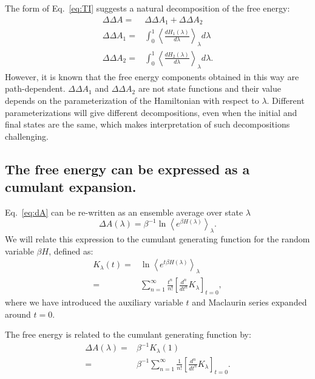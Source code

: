 \documentclass{article}
\begin{document}
The form of Eq.~\ref{eq:TI} suggests a natural decomposition of the free energy:
\begin{align}
\Delta\Delta A =& \Delta\Delta A_1 + \Delta\Delta A_2 \nonumber\\
\Delta\Delta A_1 =&
	\int_0^1 \left\langle \frac{dH_1(\lambda)}{d\lambda}\right\rangle_\lambda d\lambda \nonumber\\
\Delta\Delta A_2 =&
	\int_0^1 \left\langle \frac{dH_2(\lambda)}{d\lambda}\right\rangle_\lambda d\lambda.    
\label{eq:naive}
\end{align}
However, it is known that the free energy components obtained in this way are path-dependent. $\Delta\Delta A_1$ and $\Delta\Delta A_2$ are not state functions and their value depends on the parameterization of the Hamiltonian with respect to $\lambda$. Different parameterizations will give different decompositions, even when the initial and final states are the same, which makes interpretation of such decompositions challenging.



\subsection{The free energy can be expressed as a cumulant expansion.}

Eq.~\ref{eq:dA} can be re-written as an ensemble average over state $\lambda$
\begin{equation}
\Delta A(\lambda) =
	\beta^{-1} \ln \left\langle e^{\beta H(\lambda)} \right\rangle_\lambda.
\label{eq:avg_expr}
\end{equation}
We will relate this expression to the cumulant generating function for the random variable $\beta H$, defined as:
\begin{align}
K_{\lambda}(t) =&
	\ln \left\langle 
    	e^{t \beta H(\lambda)}
    \right\rangle_\lambda \\
    =& 
    \sum_{n=1}^{\infty}
            	\frac{t^n}{n!}
                \left[ \frac{d^n}{dt^n} K_{\lambda}\right]_{t=0},
\end{align}
where we have introduced the auxiliary variable $t$ and Maclaurin series expanded around $t=0$.

The free energy is related to the cumulant generating function by:
\begin{align}
\Delta A(\lambda) =& \beta^{-1} K_{\lambda}(1) \nonumber\\
                  =& \beta^{-1} \sum_{n=1}^{\infty}
            			\frac{1}{n!}\left[
                        	\frac{d^n}{dt^n} K_{\lambda}
                        \right]_{t=0}.
\label{eq:cumu_dA}
\end{align}
\end{document}
